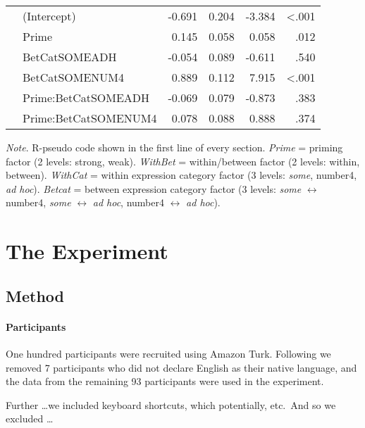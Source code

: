 \documentclass[10pt]{article}
\begin{document}
\begin{multicols}{2}
\begin{table*}[ht]
\begin{center}
\begin{tabular}{llrrrr}
      & (Intercept)  & -0.691 & 0.204 & -3.384 & <.001\\
      & Prime & 0.145 & 0.058 & 0.058 & .012 \\
      & BetCatSOMEADH & -0.054 & 0.089 & -0.611 & .540 \\
      & BetCatSOMENUM4 & 0.889 & 0.112 & 7.915 & <.001 \\
      & Prime:BetCatSOMEADH & -0.069 & 0.079 & -0.873 & .383 \\
      & Prime:BetCatSOMENUM4 & 0.078 & 0.088 & 0.888 & .374 \\
      \hline
    \end{tabular}
\end{center}
\emph{Note}. R-pseudo code shown in the first line of every section.
  \emph{Prime} = priming factor (2 levels: strong, weak).
  \emph{WithBet} = within/between factor (2 levels: within, between).
  \emph{WithCat} = within expression category factor (3 levels: \emph{some}, number4, \emph{ad hoc}).
  \emph{Betcat} = between expression category factor (3 levels: \emph{some} \(\leftrightarrow\) number4, \emph{some} \(\leftrightarrow\) \emph{ad hoc}, number4 \(\leftrightarrow\) \emph{ad hoc}).
\end{table*}



\section{The Experiment}
\label{sec:experiment}



\subsection{Method}
\label{sec:method}


\paragraph{Participants}

One hundred participants were recruited using Amazon Turk.
Following \citeauthor{Bott:2016aa} we removed 7 participants who did not declare English as their native language, and the data from the remaining 93 participants were used in the experiment.

{\color{red} Further \dots we included keyboard shortcuts, which potentially, etc.\ And so we excluded \dots}


\end{multicols}
\end{document}
